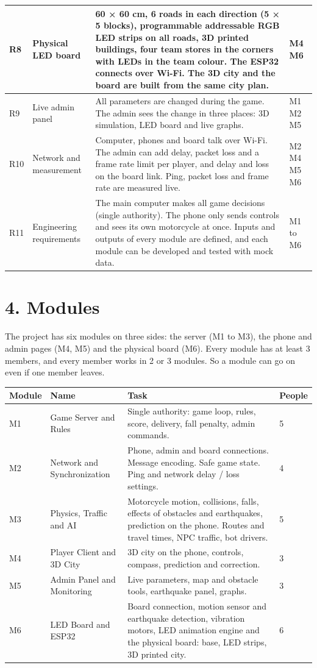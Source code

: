 \documentclass[
  english,
  10pt,
  a4paper,
]{article}
\newcommand{\ckkeep}[1]{\par\noindent\begin{minipage}{\linewidth}\setlength{\parskip}{4pt}#1\end{minipage}\par\smallskip}
\begin{document}
{\begin{tabular}{|L{0.05}|L{0.16}|L{0.63}|L{0.16}|}
R8 & Physical LED board & 60 × 60 cm, 6 roads in each direction (5 × 5 blocks), programmable addressable RGB LED strips on all roads, 3D printed buildings, four team stores in the corners with LEDs in the team colour. The ESP32 connects over Wi-Fi. The 3D city and the board are built from the same city plan. & M4 M6 \\ \hline
R9 & Live admin panel & All parameters are changed during the game. The admin sees the change in three places: 3D simulation, LED board and live graphs. & M1 M2 M5 \\ \hline
R10 & Network and measurement & Computer, phones and board talk over Wi-Fi. The admin can add delay, packet loss and a frame rate limit per player, and delay and loss on the board link. Ping, packet loss and frame rate are measured live. & M2 M4 M5 M6 \\ \hline
R11 & Engineering requirements & The main computer makes all game decisions (single authority). The phone only sends controls and sees its own motorcycle at once. Inputs and outputs of every module are defined, and each module can be developed and tested with mock data. & M1 to M6 \\ \hline
\end{tabular}}

\section{4. Modules}

\ckkeep{%
The project has six modules on three sides: the server (M1 to M3), the phone and admin pages (M4,
M5) and the physical board (M6). Every module has at least 3 members, and every member works in 2 or
3 modules. So a module can go on even if one member leaves.

\begin{tabular}{|L{0.07}|L{0.28}|L{0.56}|L{0.09}|}
\hline \textbf{Module} & \textbf{Name} & \textbf{Task} & \textbf{People} \\ \hline 
M1 & Game Server and Rules & Single authority: game loop, rules, score, delivery, fall penalty, admin commands. & 5 \\ \hline
M2 & Network and Synchronization & Phone, admin and board connections. Message encoding. Safe game state. Ping and network delay / loss settings. & 4 \\ \hline
M3 & Physics, Traffic and AI & Motorcycle motion, collisions, falls, effects of obstacles and earthquakes, prediction on the phone. Routes and travel times, NPC traffic, bot drivers. & 5 \\ \hline
M4 & Player Client and 3D City & 3D city on the phone, controls, compass, prediction and correction. & 3 \\ \hline
M5 & Admin Panel and Monitoring & Live parameters, map and obstacle tools, earthquake panel, graphs. & 3 \\ \hline
M6 & LED Board and ESP32 & Board connection, motion sensor and earthquake detection, vibration motors, LED animation engine and the physical board: base, LED strips, 3D printed city. & 6 \\ \hline
\end{tabular}}
\end{document}
